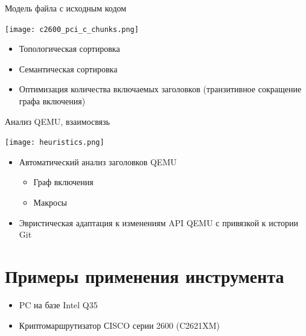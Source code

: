 \documentclass[unicode,hyperref={unicode=true}]{beamer}
\newcommand*{\sectionpagekb}{\usebeamertemplate*{section page kb}}
\theoremstyle{definition}
\theoremstyle{plain}
\begin{document}
\begin{frame}{Модель файла с исходным кодом}
\begin{minipage}{0.61\textwidth}
\texttt{[image: c2600\_pci\_c\_chunks.png]}
\end{minipage}
\begin{minipage}{0.37\textwidth}
\begin{itemize}
\item Топологическая сортировка
\item Семантическая сортировка
\item Оптимизация количества включаемых заголовков (транзитивное сокращение
графа включения)
\end{itemize}
\end{minipage}
\end{frame}



\begin{frame}{Анализ QEMU, взаимосвязь}
\begin{minipage}{0.35\textwidth}
\texttt{[image: heuristics.png]}
\end{minipage}
\hfill
\begin{minipage}{0.63\textwidth}
\begin{itemize}
\item Автоматический анализ заголовков QEMU
    \begin{itemize}
    \item Граф включения
    \item Макросы
    \end{itemize}
\item Эвристическая адаптация к изменениям API QEMU с привязкой к истории Git
\end{itemize}
\end{minipage}
\end{frame}



\section{Примеры применения инструмента}
\begin{frame}
\sectionpagekb
\begin{itemize}
\item PC на базе Intel Q35
\item Криптомаршрутизатор СISCO серии 2600 (C2621XM)
\end{itemize}
\end{frame}
\end{document}
